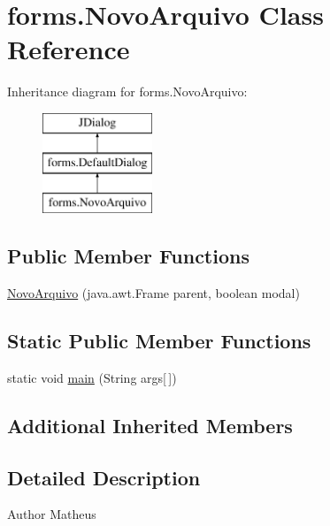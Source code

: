 \hypertarget{classforms_1_1_novo_arquivo}{\section{forms.\+Novo\+Arquivo Class Reference}
\label{classforms_1_1_novo_arquivo}
}
Inheritance diagram for forms.\+Novo\+Arquivo\+:\begin{figure}[H]
\begin{center}
\leavevmode
\includegraphics[height=3.000000cm]{classforms_1_1_novo_arquivo}
\end{center}
\end{figure}
\subsection*{Public Member Functions}
\begin{DoxyCompactItemize}
\item 
\hyperlink{classforms_1_1_novo_arquivo_a8b888c0fd02136097353bb8030dfa283}{Novo\+Arquivo} (java.\+awt.\+Frame parent, boolean modal)
\end{DoxyCompactItemize}
\subsection*{Static Public Member Functions}
\begin{DoxyCompactItemize}
\item 
static void \hyperlink{classforms_1_1_novo_arquivo_a68982a9f6a69dc98ef6062e4b45f2e12}{main} (String args\mbox{[}$\,$\mbox{]})
\end{DoxyCompactItemize}
\subsection*{Additional Inherited Members}


\subsection{Detailed Description}
\begin{DoxyAuthor}{Author}
Matheus 
\end{DoxyAuthor}


